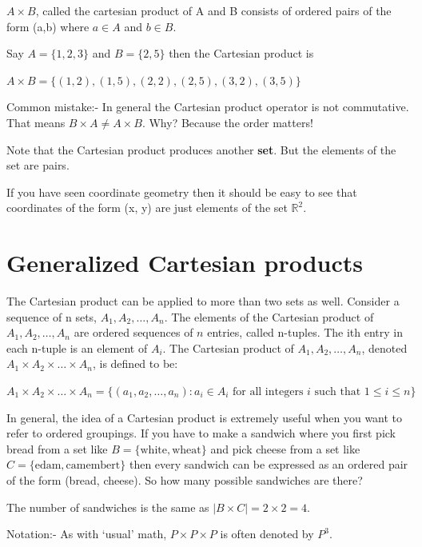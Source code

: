 \documentclass[12pt]{article}
\begin{document}
$A \times B$, called the cartesian product of A and B consists of ordered pairs of the form (a,b) where $a \in A$ and $b \in B$.

Say $A = \{1,2,3\}$ and $B = \{2,5\}$ then the Cartesian product is

$A \times B = \{(1,2), (1,5), (2,2), (2,5), (3,2), (3,5)\}$ 

Common mistake:- In general the Cartesian product operator is not commutative. That means $B \times A \neq A \times B$. Why? Because the order matters!

Note that the Cartesian product produces another {\bf set}. But the elements of the set are pairs. 

\medskip

If you have seen coordinate geometry then it should be easy to see that coordinates of the form (x, y) are just elements of the set $\mathbb{R}^2$. 

\section*{Generalized Cartesian products}

The Cartesian product can be applied to more than two sets as well. Consider a sequence of n sets, $A_1, A_2, \ldots, A_n$. The elements of the Cartesian product of $A_1, A_2, \ldots, A_n$ are ordered sequences of $n$ entries, called n-tuples. The ith entry in each n-tuple is an element of $A_i$. The Cartesian product of $A_1, A_2, \ldots, A_n$, denoted $A_1 \times A_2 \times \ldots \times A_n$, is defined to be:

$A_1 \times A_2 \times \ldots \times A_n = \{ (a_1, a_2, \ldots , a_n) : a_i \in A_i \text{ for all integers } i \text{ such that } 1 \le i \le n\}$

In general, the idea of a Cartesian product is extremely useful when you want to refer to ordered groupings. If you have to make a sandwich where you first pick bread from a set like $B = \{\text{white},\text{wheat}\}$ and pick cheese from a set like 
$C = \{\text{edam}, \text{camembert}\}$ then every sandwich can be expressed as an ordered pair of the form (bread, cheese). So how many possible sandwiches are there? 

The number of sandwiches is the same as $|B \times C| = 2 \times 2 = 4$.

\vspace{1cm}

Notation:- As with `usual' math, $P \times P \times P$ is often denoted by $P^3$.
\vspace{1cm}
\end{document}
